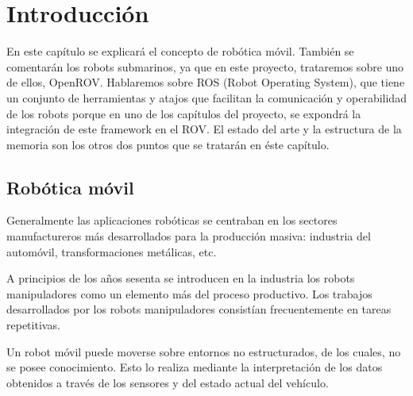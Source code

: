 \chapter{Introducción}

En este capítulo se explicará el concepto de robótica móvil\cite{RoboticaMovil}.
También se comentarán los robots submarinos, ya que en este proyecto, trataremos sobre uno de ellos, OpenROV.
Hablaremos sobre ROS (Robot Operating System), que tiene un conjunto de herramientas y atajos que facilitan la comunicación y operabilidad de los robots porque en uno de los capítulos del proyecto, se expondrá la integración de este framework en el ROV.
El estado del arte y la estructura de la memoria son los otros dos puntos que se tratarán en éste capítulo.

\section{Robótica móvil}
\label{cap:roboticamovil}
Generalmente las aplicaciones robóticas se centraban en los sectores manufactureros más desarrollados para la producción masiva: industria del automóvil, transformaciones metálicas, etc.

A principios de los años sesenta se introducen en la industria los robots manipuladores como un elemento más del proceso productivo. Los trabajos desarrollados por los robots manipuladores consistían frecuentemente en tareas repetitivas.

Un robot móvil puede moverse sobre entornos no estructurados, de los cuales, no se posee conocimiento. Esto lo realiza mediante la interpretación de los datos obtenidos a través de los sensores y del estado actual del vehículo. 

